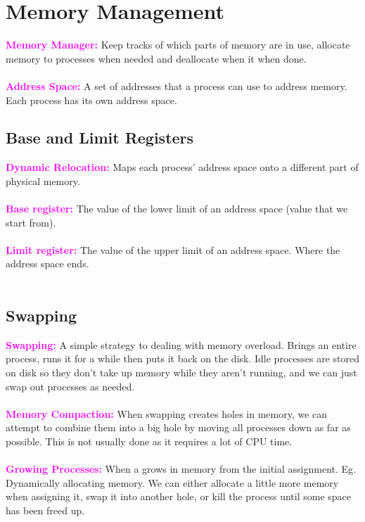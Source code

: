 \documentclass[a4paper,10pt]{article}
\begin{document}
\section{Memory Management}
\textcolor{Magenta}{\textbf{Memory Manager:}} Keep tracks of which parts of memory are in use, allocate memory to processes when needed and deallocate when it when done. \\\\
\textcolor{Magenta}{\textbf{Address Space:}} A set of addresses that a process can use to address memory. Each process has its own address space.
\subsection{Base and Limit Registers}
\textcolor{Magenta}{\textbf{Dynamic Relocation:}} Maps each process' address space onto a different part of physical memory. \\\\
\textcolor{Magenta}{\textbf{Base register:}} The value of the lower limit of an address space (value that we start from). \\\\
\textcolor{Magenta}{\textbf{Limit register:}} The value of the upper limit of an address space. Where the address space ends. \\\\
\subsection{Swapping}
\textcolor{Magenta}{\textbf{Swapping:}} A simple strategy to dealing with memory overload. Brings an entire process, runs it for a while then puts it back on the disk. Idle processes are stored on disk so they don't take up memory while they aren't running, and we can just swap out processes as needed. \\\\
\textcolor{Magenta}{\textbf{Memory Compaction:}} When swapping creates holes in memory, we can attempt to combine them into a big hole by moving all processes down as far as possible. This is not usually done as it requires a lot of CPU time. \\\\  
\textcolor{Magenta}{\textbf{Growing Processes:}} When a grows in memory from the initial assignment. Eg. Dynamically allocating memory. We can either allocate a little more memory when assigning it, swap it into another hole, or kill the process until some space has been freed up. 
\end{document}
